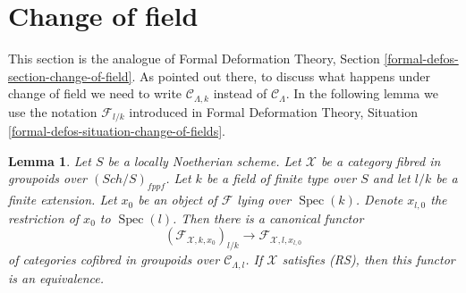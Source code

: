 \documentclass{stacks-project}
\theoremstyle{plain}
\newtheorem{lemma}[subsection]{Lemma}
\theoremstyle{definition}
\theoremstyle{remark}
\numberwithin{equation}{subsection}
\def\Spec{\mathop{\mathrm{Spec}}}
\def\Sch{\mathit{Sch}}
\begin{document}
\section{Change of field}
\label{section-change-of-field}

\noindent
This section is the analogue of
Formal Deformation Theory, Section \ref{formal-defos-section-change-of-field}.
As pointed out there, to discuss what happens under change of field
we need to write $\mathcal{C}_{\Lambda, k}$ instead of $\mathcal{C}_\Lambda$.
In the following lemma we use the notation $\mathcal{F}_{l/k}$
introduced in Formal Deformation Theory, Situation
\ref{formal-defos-situation-change-of-fields}.

\begin{lemma}
\label{lemma-change-of-field}
Let $S$ be a locally Noetherian scheme. Let $\mathcal{X}$ be a category
fibred in groupoids over $(\Sch/S)_{fppf}$. Let $k$ be a
field of finite type over $S$ and let $l/k$ be a finite extension.
Let $x_0$ be an object of $\mathcal{F}$ lying over $\Spec(k)$.
Denote $x_{l, 0}$ the restriction of $x_0$ to $\Spec(l)$.
Then there is a canonical functor
$$
(\mathcal{F}_{\mathcal{X}, k , x_0})_{l/k}
\longrightarrow
\mathcal{F}_{\mathcal{X}, l, x_{l, 0}}
$$
of categories cofibred in groupoids over $\mathcal{C}_{\Lambda, l}$.
If $\mathcal{X}$ satisfies (RS), then this functor is an equivalence.
\end{lemma}
\end{document}
